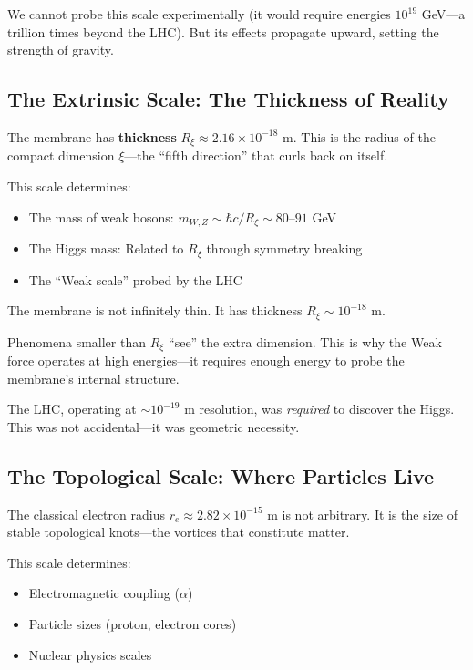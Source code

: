 We cannot probe this scale experimentally (it would require energies $10^{19}$ GeV---a trillion times beyond the LHC). But its effects propagate upward, setting the strength of gravity.

\subsection{The Extrinsic Scale: The Thickness of Reality}
\label{subsec:extrinsic}

The membrane has \textbf{thickness} $R_\xi \approx 2.16 \times 10^{-18}$ m. This is the radius of the compact dimension $\xi$---the ``fifth direction'' that curls back on itself.

This scale determines:
\begin{itemize}
    \item The mass of weak bosons: $m_{W,Z} \sim \hbar c / R_\xi \sim 80$--$91$ GeV
    \item The Higgs mass: Related to $R_\xi$ through symmetry breaking
    \item The ``Weak scale'' probed by the LHC
\end{itemize}

\begin{tcolorbox}[colback=green!5,colframe=green!70!black,title=\textbf{Key Insight}]
The membrane is not infinitely thin. It has thickness $R_\xi \sim 10^{-18}$ m.

Phenomena smaller than $R_\xi$ ``see'' the extra dimension. This is why the Weak force operates at high energies---it requires enough energy to probe the membrane's internal structure.

The LHC, operating at $\sim 10^{-19}$ m resolution, was \textit{required} to discover the Higgs. This was not accidental---it was geometric necessity.
\end{tcolorbox}

\subsection{The Topological Scale: Where Particles Live}
\label{subsec:topological}

The classical electron radius $r_e \approx 2.82 \times 10^{-15}$ m is not arbitrary. It is the size of stable topological knots---the vortices that constitute matter.

This scale determines:
\begin{itemize}
    \item Electromagnetic coupling ($\alpha$)
    \item Particle sizes (proton, electron cores)
    \item Nuclear physics scales
\end{itemize}

